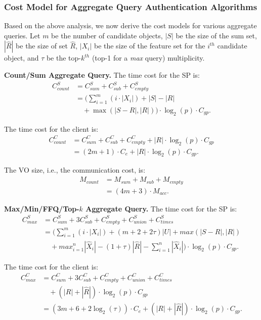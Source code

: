 \subsubsection{Cost Model for Aggregate Query Authentication Algorithms}
Based on the above analysis, we now derive the cost models for various aggregate queries. Let $m$ be the number of candidate objects, $|S|$ be the size of the sum set, $|\widehat{R}|$ be the size of set $\widehat{R}$, $|X_i|$ be the size of the feature set for the $i^{th}$ candidate object, and $\tau$ be the top-$k^{th}$ (top-1 for a \emph{max} query) multiplicity.

\textbf{Count/Sum Aggregate Query.}
The time cost for the SP is:
\begin{align*}
  C_{count}^S &= C_{sum}^S + C_{sub}^S + C_{empty}^S \nonumber \\
              &= ( \sum_{i=1}^m(i \cdot |X_i|) + |S| - |R| \nonumber\\
              &\quad + \max(|S-R|, |R|)) \cdot \log_2(p) \cdot C_{gp}.
\end{align*}

The time cost for the client is:
\begin{align*}
  C_{count}^C &= C_{sum}^C + C_{sub}^C + C_{empty}^C + |R| \cdot \log_2(p) \cdot C_{gp} \nonumber \\
              &= (2m + 1) \cdot C_e  + |R| \cdot \log_2(p) \cdot C_{gp}.
\end{align*}

The VO size, i.e., the communication cost, is:
\begin{align*}
  M_{count} &= M_{sum} + M_{sub} + M_{empty}\nonumber  \\
            & =  (4m + 3) \cdot M_{acc}.
\end{align*}

\textbf{Max/Min/FFQ/Top-$k$ Aggregate Query.}
The time cost for the SP is:
\begin{align*}
  C_{max}^S &= C_{sum}^S + 3 C_{sub}^S + C_{empty}^S + C_{union}^S + C_{times}^S \nonumber \\ %
            &=(\sum_{i=1}^m ( i \cdot |X_i|) + (m+2+2\tau)|U| + max(|S-R|, |R|)\nonumber\\ %
            &\quad  + max_{i=1}^n|\widehat{X}_i| - (1 + \tau) |\widehat{R}|- \sum_{i=1}^n|\widehat{X}_i|) \cdot \log_2(p) \cdot C_{gp}. %
\end{align*}

The time cost for the client is:
\begin{align*}
  C_{max}^C &= C_{sum}^C + 3 C_{sub}^C + C_{empty}^C + C_{union}^C + C_{times}^C \nonumber\\ %
            &\quad + (|R| + |\widehat{R}|) \cdot \log_2(p) \cdot C_{gp}\nonumber \\
            &= (3m + 6 + 2\log_2(\tau)) \cdot C_e + (|R| + |\widehat{R}|) \cdot \log_2(p) \cdot C_{gp}.
\end{align*}

